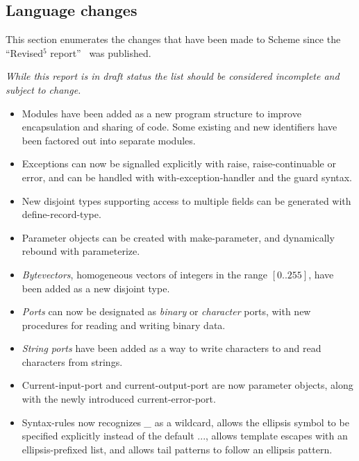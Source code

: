 

\subsection*{Language changes}
\label{differences}

This section enumerates the changes that have been made to Scheme since
the ``Revised$^5$ report''~\cite{R5RS} was published.

{\em While this report is in draft status the list should be considered incomplete and subject to change.}

\begin{itemize}

\item Modules have been added as a new program structure to improve
encapsulation and sharing of code.  Some existing and new identifiers
have been factored out into separate modules.

\item Exceptions can now be signalled explicitly with {\cf raise},
{\cf raise-continuable} or {\cf error}, and can be handled with {\cf
with-exception-handler} and the {\cf guard} syntax.

\item New disjoint types supporting access to multiple fields can be
generated with {\cf define-record-type}.

\item Parameter objects can be created with {\cf make-parameter}, and
dynamically rebound with {\cf parameterize}.

\item {\em Bytevectors}, homogeneous vectors of integers in the range
$[0..255]$, have been added as a new disjoint type.

\item {\em Ports} can now be designated as {\em binary} or {\em
character} ports, with new procedures for reading and writing binary
data.

\item {\em String ports} have been added as a way to write characters
to and read characters from strings.

\item {\cf Current-input-port} and {\cf current-output-port} are now
parameter objects, along with the newly introduced {\cf
current-error-port}.

\item {\cf Syntax-rules} now recognizes {\em \_} as a wildcard, allows
the ellipsis symbol to be specified explicitly instead of the default
{\cf ...}, allows template escapes with an ellipsis-prefixed list, and
allows tail patterns to follow an ellipsis pattern.


\end{itemize}
